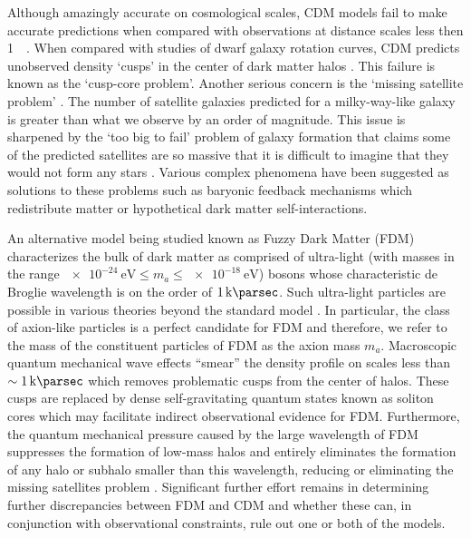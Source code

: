 \documentclass[usenatbib]{mnras}
\newcommand{\squote}[1]{\lq #1\rq}
\newcommand{\poweV}[1]{\SI{e#1}{\electronvolt}}
\begin{document}
\par

Although amazingly accurate on cosmological scales, CDM models fail to make accurate predictions when compared with observations at distance scales less then \SI{1}{\kilo\parsec}. When compared with studies of dwarf galaxy rotation curves, CDM predicts unobserved density \squote{cusps} in the center of dark matter halos \citep{ultralight}. This failure is known as the \squote{cusp-core problem}. Another serious concern is the \squote{missing satellite problem}  \citep{missing_satellites}. The number of satellite galaxies predicted for a milky-way-like galaxy is greater than what we observe by an order of magnitude. This issue is sharpened by the \squote{too big to fail} problem of galaxy formation that claims some of the predicted satellites are so massive that it is difficult to imagine that they would not form any stars \citep{too_big_to_fail}. Various complex phenomena have been suggested as solutions to these problems such as baryonic feedback mechanisms which redistribute matter or  hypothetical dark matter self-interactions.

\par

An alternative model being studied known as Fuzzy Dark Matter (FDM) characterizes the bulk of dark matter as comprised of ultra-light (with masses in the range $\poweV{-24} \leq m_a \leq \poweV{-18}$) bosons whose characteristic de Broglie wavelength is on the order of $\SI{1}{\kilo\parsec}$. Such ultra-light particles are possible in various theories beyond the standard model \citep{axion_cosmology}. In particular, the class of axion-like particles is a perfect candidate for FDM and therefore, we refer to the mass of the constituent particles of FDM as the axion mass $m_a$. Macroscopic quantum mechanical wave effects “smear” the density profile on scales less than $\sim \SI{1}{\kilo\parsec}$ which removes problematic cusps from the center of halos. These cusps are replaced by dense self-gravitating quantum states known as soliton cores which may facilitate indirect observational evidence for FDM. Furthermore, the quantum mechanical pressure caused by the large wavelength of FDM suppresses the formation of low-mass halos and entirely eliminates the formation of any halo or subhalo smaller than this wavelength, reducing or eliminating the missing satellites problem \citep{substructure_FDM}. Significant further effort remains in determining further discrepancies between FDM and CDM and whether these can, in conjunction with observational constraints, rule out one or both of the models.
 
\end{document}
